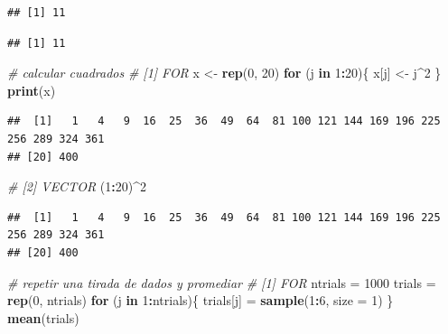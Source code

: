 \documentclass[
]{book}
\newenvironment{Shaded}{\begin{snugshade}}{\end{snugshade}}
\newcommand{\CommentTok}[1]{\textcolor[rgb]{0.56,0.35,0.01}{\textit{#1}}}
\newcommand{\ControlFlowTok}[1]{\textcolor[rgb]{0.13,0.29,0.53}{\textbf{#1}}}
\newcommand{\DataTypeTok}[1]{\textcolor[rgb]{0.13,0.29,0.53}{#1}}
\newcommand{\DecValTok}[1]{\textcolor[rgb]{0.00,0.00,0.81}{#1}}
\newcommand{\KeywordTok}[1]{\textcolor[rgb]{0.13,0.29,0.53}{\textbf{#1}}}
\newcommand{\NormalTok}[1]{#1}
\newcommand{\OperatorTok}[1]{\textcolor[rgb]{0.81,0.36,0.00}{\textbf{#1}}}
\newcommand{\StringTok}[1]{\textcolor[rgb]{0.31,0.60,0.02}{#1}}
\begin{document}
\begin{verbatim}
## [1] 11
\end{verbatim}

\begin{Shaded}
\end{Shaded}

\begin{verbatim}
## [1] 11
\end{verbatim}

\begin{Shaded}
\begin{Highlighting}[]
\CommentTok{# calcular cuadrados}
\CommentTok{# [1] FOR}
\NormalTok{x <-}\StringTok{ }\KeywordTok{rep}\NormalTok{(}\DecValTok{0}\NormalTok{, }\DecValTok{20}\NormalTok{)}
\ControlFlowTok{for}\NormalTok{ (j }\ControlFlowTok{in} \DecValTok{1}\OperatorTok{:}\DecValTok{20}\NormalTok{)\{}
\NormalTok{  x[j] <-}\StringTok{ }\NormalTok{j}\OperatorTok{^}\DecValTok{2}
\NormalTok{\}}
\KeywordTok{print}\NormalTok{(x)}
\end{Highlighting}
\end{Shaded}

\begin{verbatim}
##  [1]   1   4   9  16  25  36  49  64  81 100 121 144 169 196 225 256 289 324 361
## [20] 400
\end{verbatim}

\begin{Shaded}
\begin{Highlighting}[]
\CommentTok{# [2] VECTOR}
\NormalTok{(}\DecValTok{1}\OperatorTok{:}\DecValTok{20}\NormalTok{)}\OperatorTok{^}\DecValTok{2}
\end{Highlighting}
\end{Shaded}

\begin{verbatim}
##  [1]   1   4   9  16  25  36  49  64  81 100 121 144 169 196 225 256 289 324 361
## [20] 400
\end{verbatim}

\begin{Shaded}
\begin{Highlighting}[]
\CommentTok{# repetir una tirada de dados y promediar}
\CommentTok{# [1] FOR}
\NormalTok{ntrials =}\StringTok{ }\DecValTok{1000}
\NormalTok{trials =}\StringTok{ }\KeywordTok{rep}\NormalTok{(}\DecValTok{0}\NormalTok{, ntrials)}
\ControlFlowTok{for}\NormalTok{ (j }\ControlFlowTok{in} \DecValTok{1}\OperatorTok{:}\NormalTok{ntrials)\{}
\NormalTok{  trials[j] =}\StringTok{ }\KeywordTok{sample}\NormalTok{(}\DecValTok{1}\OperatorTok{:}\DecValTok{6}\NormalTok{, }\DataTypeTok{size =} \DecValTok{1}\NormalTok{)}
\NormalTok{\}}
\KeywordTok{mean}\NormalTok{(trials)}
\end{Highlighting}
\end{Shaded}
\end{document}

